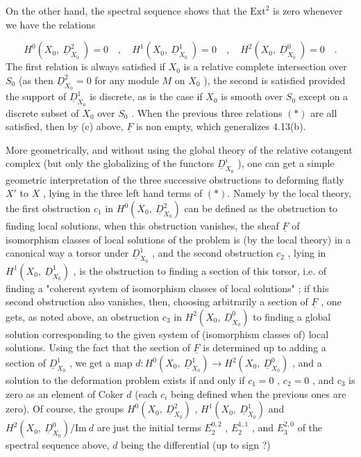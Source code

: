 On the other hand, the spectral sequence shows that the  $\mathrm{Ext}^2$  is zero whenever we have the relations

\begin{equation}\tag{*}
H^0(X_0,\ \underline{D}^2_{X_0}\ ) = 0 \quad ,\quad H^1(X_0,\ \underline{D}^1_{X_0}\ ) = 0 \quad ,\quad H^2(X_0,\ \underline{D}^0_{X_0}\ ) = 0 \quad .
\end{equation}
The first relation is always satisfied if  $X_0$  is a relative complete intersection over  $S_0$  (as then  $\underline{D}^2_{X_0} = 0$  for any module  $M$  on  $X_0$ ), the second is satisfied provided the support of  $\underline{D}^1_{X_0}$  is discrete, as is the case if  $X_0$  is smooth over  $S_0$  except on a discrete subset of  $X_0$  over  $S_0$ . When the previous three relations $(*)$ are all satisfied, then by (c) above,  $\underline{F}$  is non empty, which generalizes 4.13(b).

More geometrically, and without using the global theory of the relative cotangent complex (but only the globalizing of the functors  $\underline{D}^i_{X_0}$  ), one can get a simple geometric interpretation of the three successive obstructions to deforming flatly  $X'$  to  $X$ , lying in the three left hand terms of $(*)$. Namely by the local theory, the first obstruction  $c_1$  in  $H^0(X_0,\ \underline{D}^2_{X_0})$  can be defined as the obstruction to finding local solutions, when this obstruction vanishes, the sheaf  $\underline{F}$  of isomorphism classes of local solutions of the problem is (by the local theory) in a canonical way a torsor under  $\underline{D}^1_{X_0}$ , and the second obstruction  $c_2$ , lying in  $H^1(X_0,\ \underline{D}^1_{X_0})$ , is the obstruction to finding a section of this torsor, i.e. of finding a  "coherent system of isomorphism classes of local solutions" ; if this second obstruction also vanishes, then, choosing arbitrarily a section of  $\underline{F}$ , one gets, as noted above, an obstruction  $c_3$  in  $H^2(X_0,\ \underline{D}^0_{X_0})$  to finding a global solution corresponding to the given system of (isomorphism classes of) local solutions. Using the fact that the section of  $\underline{F}$  is determined up to adding a section of  $\underline{D}^1_{X_0}$ , we get a map  $d : H^0(X_0,\ \underline{D}^1_{X_0}) \to H^2(X_0,\ \underline{D}^0_{X_0})$ , and a solution to the deformation problem exists if and only if  $c_1 = 0$ ,  $c_2 = 0$ , and  $c_3$  is zero as an element of Coker $d$  (each  $c_i$  being defined when the previous ones are zero). Of course, the groups  $H^0(X_0,\ \underline{D}^2_{X_0})$ ,  $H^1(X_0,\ \underline{D}^1_{X_0})$  and
$H^2(X_0,\ \underline{D}^0_{X_0})/\mathrm{Im}\ d$  are just the initial terms  $E_2^{0,2}$ ,  $E_2^{1,1}$ , and  $E_3^{2,0}$  of the spectral sequence above,  $d$  being the differential (up to sign ?)

